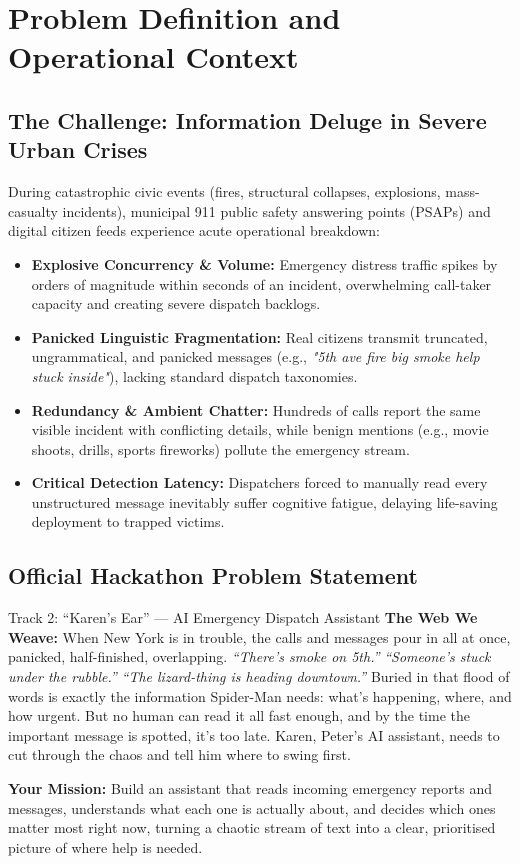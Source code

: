 \documentclass[10pt,a4paper]{article}
\begin{document}
\section{Problem Definition and Operational Context}
\subsection{The Challenge: Information Deluge in Severe Urban Crises}
During catastrophic civic events (fires, structural collapses, explosions, mass-casualty incidents), municipal 911 public safety answering points (PSAPs) and digital citizen feeds experience acute operational breakdown:
\begin{itemize}
  \item \textbf{Explosive Concurrency \& Volume:} Emergency distress traffic spikes by orders of magnitude within seconds of an incident, overwhelming call-taker capacity and creating severe dispatch backlogs.
  \item \textbf{Panicked Linguistic Fragmentation:} Real citizens transmit truncated, ungrammatical, and panicked messages (e.g., \emph{"5th ave fire big smoke help stuck inside"}), lacking standard dispatch taxonomies.
  \item \textbf{Redundancy \& Ambient Chatter:} Hundreds of calls report the same visible incident with conflicting details, while benign mentions (e.g., movie shoots, drills, sports fireworks) pollute the emergency stream.
  \item \textbf{Critical Detection Latency:} Dispatchers forced to manually read every unstructured message inevitably suffer cognitive fatigue, delaying life-saving deployment to trapped victims.
\end{itemize}

\subsection{Official Hackathon Problem Statement}
\begin{calloutbox}{Track 2: ``Karen's Ear'' --- AI Emergency Dispatch Assistant}
\small
\textbf{The Web We Weave:} When New York is in trouble, the calls and messages pour in all at once, panicked, half-finished, overlapping. \emph{``There's smoke on 5th.''} \emph{``Someone's stuck under the rubble.''} \emph{``The lizard-thing is heading downtown.''} Buried in that flood of words is exactly the information Spider-Man needs: what's happening, where, and how urgent. But no human can read it all fast enough, and by the time the important message is spotted, it's too late. Karen, Peter's AI assistant, needs to cut through the chaos and tell him where to swing first.

\vspace{0.12cm}
\textbf{Your Mission:} Build an assistant that reads incoming emergency reports and messages, understands what each one is actually about, and decides which ones matter most right now, turning a chaotic stream of text into a clear, prioritised picture of where help is needed.
\end{calloutbox}
\end{document}

